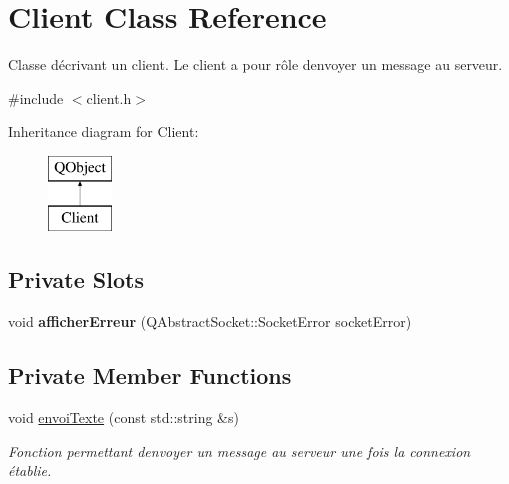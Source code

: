 \hypertarget{class_client}{}\section{Client Class Reference}
\label{class_client}


Classe décrivant un client. Le client a pour rôle d\textquotesingle{}envoyer un message au serveur.  




{\ttfamily \#include $<$client.\+h$>$}

Inheritance diagram for Client\+:\begin{figure}[H]
\begin{center}
\leavevmode
\includegraphics[height=2.000000cm]{class_client}
\end{center}
\end{figure}
\subsection*{Private Slots}
\begin{DoxyCompactItemize}
\item 
\mbox{\label{class_client_ae5983d9d73779ff3a90acb1b73cf69cf}} 
void {\bfseries afficher\+Erreur} (Q\+Abstract\+Socket\+::\+Socket\+Error socket\+Error)
\end{DoxyCompactItemize}
\subsection*{Private Member Functions}
\begin{DoxyCompactItemize}
\item 
\mbox{\label{class_client_ac55d565ea5da905ca3e3dea4da471a03}} 
void \mbox{\hyperlink{class_client_ac55d565ea5da905ca3e3dea4da471a03}{envoi\+Texte}} (const std\+::string \&s)
\begin{DoxyCompactList}\small\item\em Fonction permettant d\textquotesingle{}envoyer un message au serveur une fois la connexion établie. \end{DoxyCompactList}\end{DoxyCompactItemize}
